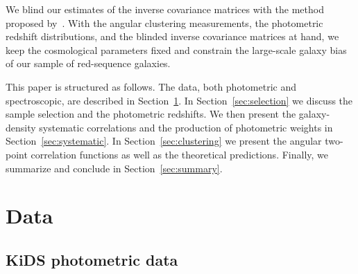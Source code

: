 \documentclass[fleqn,usenatbib,useAMS]{mnras}
\begin{document}
We blind our estimates of the inverse covariance matrices with the method proposed by~\citet{sellentin2019}. With the angular clustering measurements, the photometric redshift distributions, and the blinded inverse covariance matrices at hand, we keep the cosmological parameters fixed and constrain the large-scale galaxy bias of our sample of red-sequence galaxies. 


This paper is structured as follows. The data, both photometric and spectroscopic, are described in Section~\ref{sec:data}. In Section~\ref{sec:selection} we discuss the sample selection and the photometric redshifts. We then present the galaxy-density systematic correlations and the production of photometric weights in Section~\ref{sec:systematic}. In Section~\ref{sec:clustering} we present the angular two-point correlation functions as well as the theoretical predictions. Finally, we summarize and conclude in Section~\ref{sec:summary}. 

\section{Data}\label{sec:data}

\subsection{KiDS photometric data}\label{sec:kids}
\end{document}
